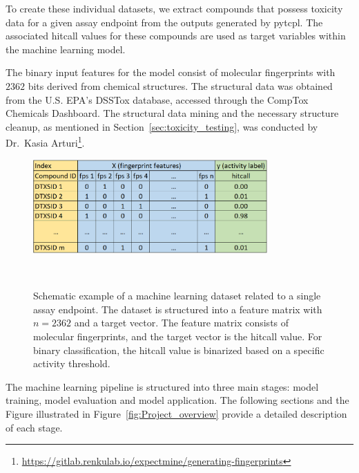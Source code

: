 To create these individual datasets, we extract compounds that possess toxicity data for a given assay endpoint from the outputs generated by pytcpl. The associated hitcall values for these compounds are used as target variables within the machine learning model.

The binary input features for the model consist of molecular fingerprints with $2362$ bits derived from chemical structures. The structural data was obtained from the U.S. EPA's DSSTox database, accessed through the CompTox Chemicals Dashboard. The structural data mining and the necessary structure cleanup, as mentioned in Section~\ref{sec:toxicity_testing}, was conducted by Dr.\ Kasia Arturi\footnote{\url{https://gitlab.renkulab.io/expectmine/generating-fingerprints}}.

\begin{figure} 
    \centering
    \includegraphics[width=0.8\textwidth]{figures/ml_dataset.png}
    \caption{Schematic example of a machine learning dataset related to a single assay endpoint. The dataset is structured into a feature matrix with $n=2362$ and a target vector. The feature matrix consists of molecular fingerprints, and the target vector is the hitcall value. For binary classification, the hitcall value is binarized based on a specific activity threshold.}
~\label{fig:ml_dataset}
\end{figure}


The machine learning pipeline is structured into three main stages: model training, model evaluation and model application. The following sections and the Figure illustrated in Figure~\ref{fig:Project_overview} provide a detailed description of each stage.

